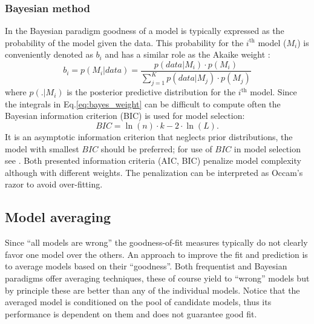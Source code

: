 \subsubsection*{Bayesian method}
In the Bayesian paradigm goodness of a model is typically expressed as the probability of the model given the data. This probability for the $i^\mathrm{th}$ model ($M_i$) is conveniently denoted as $b_i$ and has a similar role as the Akaike weight \citep{Hoeting1999}:
\begin{equation}
\label{eq:bayes_weight}
	{b_i} = p\left( {{M_i}|data} \right) = \frac{{p\left( {\left. {data} \right|{M_i}} \right) \cdot p\left( {{M_i}} \right)}}{{\sum\nolimits_{j = 1}^K {p\left( {\left. {data} \right|{M_j}} \right) \cdot p\left( {{M_j}} \right)} }}
\end{equation}
where $p\left( {\left. {.} \right|{M_i}} \right)$ is the posterior predictive distribution for the $i^\mathrm{th}$ model. Since the integrals in Eq.\ref{eq:bayes_weight} can be difficult to compute often the Bayesian information criterion (BIC) is used for model selection:
\begin{equation}
	{BIC} = \ln \left( n \right) \cdot k - 2 \cdot \ln \left( L \right).
\end{equation}
It is an asymptotic information criterion that neglects prior distributions, the model with smallest $BIC$ should be preferred; for use of $BIC$ in model selection see \citet{Burnham2004}.
Both presented information criteria (AIC, BIC) penalize model complexity although with different weights. The penalization can be interpreted as Occam's razor to avoid over-fitting.



\subsection{Model averaging}
\label{subsec:model_averaging}
Since ``all models are wrong'' the goodness-of-fit measures typically do not clearly favor one model over the others. An approach to improve the fit and prediction is to average models based on their ``goodness''. Both frequentist and Bayesian paradigms offer averaging techniques, these of course yield to ``wrong'' models but by principle these are better than any of the individual models. Notice that the averaged model is conditioned on the pool of candidate models, thus its performance is dependent on them and does not guarantee good fit.

